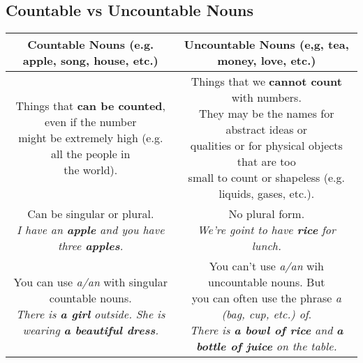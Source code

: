 \documentclass[10pt,a4paper]{article}
\begin{document}
\subsection{Countable vs Uncountable Nouns}
\vspace{0.5cm}
\begin{tabular}{|c|c|}
		\hline
		\textbf{Countable Nouns (e.g. apple, song, house, etc.)} & \textbf{Uncountable Nouns (e,g, tea, money, love, etc.)}\\
		\hline
		\parbox[t]{8cm}{\vspace{0.08cm} Things that \textbf{can be counted}, even if the number\\ might be extremely high (e.g. all the people in\\ the world).\vspace{0.08cm}} & \parbox[t]{8cm}{\vspace{0.08cm}Things that we \textbf{cannot count} with numbers.\\ They may be the names for abstract ideas or\\ qualities or for physical objects that are too\\ small to count or shapeless (e.g. liquids, gases, etc.).\vspace{0.4cm}}\\
		\hline
		\parbox[t]{8cm}{\vspace{0.08cm}Can be singular or plural.\\ \textit{I have an \textbf{apple} and you have three \textbf{apples}.}\vspace{0.08cm}} & \parbox[t]{8cm}{ \vspace{0.08cm}No plural form.\\\textit{We're goint to have \textbf{rice} for lunch.}\vspace{0.4cm}}\\
		\hline
		\parbox[t]{8cm}{\vspace{0.08cm}You can use \textit{a/an} with singular countable nouns.\\ \textit{There is \textbf{a girl} outside. She is wearing \textbf{a beautiful dress}.}\vspace{0.08cm}} & \parbox[t]{8cm}{\vspace{0.08cm}You can't use \textit{a/an} wih uncountable nouns. But \\ you can often use the phrase \textit{a (bag, cup, etc.) of}.\\ \textit{There is \textbf{a bowl of rice} and \textbf{a bottle of juice} on the table.} \vspace{0.4cm}}\\

\end{tabular}
\end{document}
